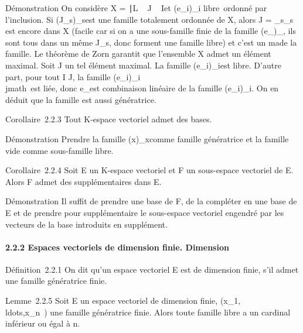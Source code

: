 \documentclass[]{article}
\begin{document}
Démonstration On considère X =
\J∣L \subset~ J \subset~
I\text et
(e\_i)\_i\inJ\text
libre\ ordonné par l'inclusion. Si
(J\_s)\_s\inS est une famille totalement ordonnée de X,
alors J = \cup\_s\inSJ\_s est encore dans X (facile car si on
a une sous-famille finie de la famille (e\_\jmath)\_\jmath\inJ, ils
sont tous dans un même J\_s, donc forment une famille libre) et
c'est un ma\jmathorant de la famille. Le théorème de Zorn garantit que
l'ensemble X admet un élément maximal. Soit J un tel élément maximal. La
famille (e\_i)\_i\inJ est libre. D'autre part, pour tout \jmath
\in I \diagdown J, la famille
(e\_i)\_i\inI\cup\\jmath\ est
liée, donc e\_\jmath est combinaison linéaire de la famille
(e\_i)\_i\inJ. On en déduit que la famille est aussi
génératrice.

Corollaire~2.2.3 Tout K-espace vectoriel admet des bases.

Démonstration Prendre la famille (x)\_x\inE comme famille
génératrice et la famille vide comme sous-famille libre.

Corollaire~2.2.4 Soit E un K-espace vectoriel et F un sous-espace
vectoriel de E. Alors F admet des supplémentaires dans E.

Démonstration Il suffit de prendre une base de F, de la compléter en une
base de E et de prendre pour supplémentaire le sous-espace vectoriel
engendré par les vecteurs de la base introduits en supplément.

\paragraph{2.2.2 Espaces vectoriels de dimension finie. Dimension}

Définition~2.2.1 On dit qu'un espace vectoriel E est de dimension finie,
s'il admet une famille génératrice finie.

Lemme~2.2.5 Soit E un espace vectoriel de dimension finie,
(x\_1,\\ldots,x\_n~)
une famille génératrice finie. Alors toute famille libre a un cardinal
inférieur ou égal à n.
\end{document}
